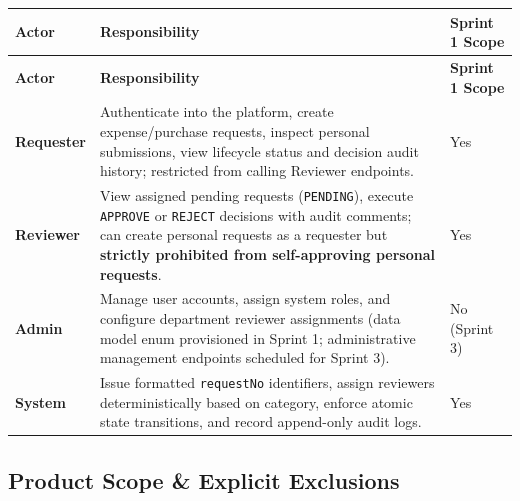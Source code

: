 \documentclass[11pt,a4paper]{article}
\begin{document}
\vspace{0.3em}
\begin{longtable}{|>{\RaggedRight}p{3.0cm}|>{\RaggedRight}p{6.8cm}|>{\RaggedRight}p{5.2cm}|}
\hline
\rowcolor{zenPale}\textbf{Actor} & \textbf{Responsibility} & \textbf{Sprint 1 Scope} \\ \hline
\endfirsthead
\hline
\rowcolor{zenPale}\textbf{Actor} & \textbf{Responsibility} & \textbf{Sprint 1 Scope} \\ \hline
\endhead
\hline
\endfoot
\textbf{Requester} & Authenticate into the platform, create expense/purchase requests, inspect personal submissions, view lifecycle status and decision audit history; restricted from calling Reviewer endpoints. & Yes \\ \hline
\textbf{Reviewer} & View assigned pending requests (\texttt{PENDING}), execute \texttt{APPROVE} or \texttt{REJECT} decisions with audit comments; can create personal requests as a requester but \textbf{strictly prohibited from self-approving personal requests}. & Yes \\ \hline
\textbf{Admin} & Manage user accounts, assign system roles, and configure department reviewer assignments (data model enum provisioned in Sprint 1; administrative management endpoints scheduled for Sprint 3). & No (Sprint 3) \\ \hline
\textbf{System} & Issue formatted \texttt{requestNo} identifiers, assign reviewers deterministically based on category, enforce atomic state transitions, and record append-only audit logs. & Yes \\ \hline
\end{longtable}
\vspace{0.3em}


\subsection{Product Scope \& Explicit Exclusions}
\end{document}
